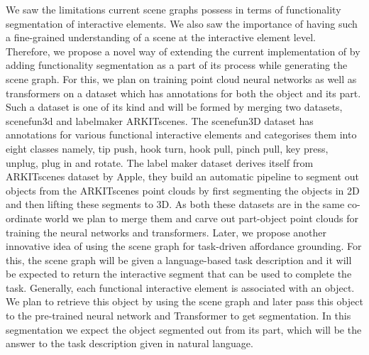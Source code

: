 We saw the limitations current scene graphs possess in terms of functionality segmentation of interactive elements. We also
saw the importance of having such a fine-grained understanding of a scene at the interactive element level. Therefore, we propose a novel way of
extending the current implementation of \cite{gu2023conceptgraphsopenvocabulary3dscene} by adding functionality segmentation as a part of its process while generating the 
scene graph. For this, we plan on training point cloud neural networks as well as transformers on a dataset which has annotations for both the
object and its part. Such a dataset is one of its kind and will be formed by merging two datasets, scenefun3d and labelmaker ARKITscenes.
The scenefun3D dataset has annotations for various functional interactive elements and categorises them into eight classes namely,
tip push, hook turn, hook pull, pinch pull, key press, unplug, plug in and rotate. The label maker dataset derives itself from ARKITscenes dataset
by Apple, they build an automatic pipeline to segment out objects from the ARKITscenes point clouds by first segmenting the objects in 2D and 
then lifting these segments to 3D. As both these datasets are in the same co-ordinate world we plan to merge them and carve out part-object
point clouds for training the neural networks and transformers. Later, we propose another innovative idea of using the scene graph for 
task-driven affordance grounding. For this, the scene graph will be given a language-based task description and it will be expected to return
the interactive segment that can be used to complete the task. Generally, each functional interactive element is associated with an object.
We plan to retrieve this object by using the scene graph and later pass this object to the pre-trained neural network and Transformer to get
segmentation. In this segmentation we expect the object segmented out from its part, which will be the answer to the task description given in 
natural language.